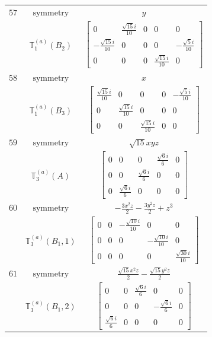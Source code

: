 \documentclass[fleqn,8pt,landscape]{jsarticle}
\begin{document}
\begin{longtable}{ccc}
$ 57 $ & $ \text{symmetry} $ & $ y $ \\
$  $ & $ \mathbb{T}_{1}^{(a)}(B_{2}) $ & $ \begin{bmatrix} 0 & \frac{\sqrt{15} i}{10} & 0 & 0 & 0 \\ - \frac{\sqrt{15} i}{10} & 0 & 0 & 0 & - \frac{\sqrt{5} i}{10} \\ 0 & 0 & 0 & \frac{\sqrt{15} i}{10} & 0 \end{bmatrix} $ \\ \hline
$ 58 $ & $ \text{symmetry} $ & $ x $ \\
$  $ & $ \mathbb{T}_{1}^{(a)}(B_{3}) $ & $ \begin{bmatrix} \frac{\sqrt{15} i}{10} & 0 & 0 & 0 & - \frac{\sqrt{5} i}{10} \\ 0 & \frac{\sqrt{15} i}{10} & 0 & 0 & 0 \\ 0 & 0 & \frac{\sqrt{15} i}{10} & 0 & 0 \end{bmatrix} $ \\ \hline
$ 59 $ & $ \text{symmetry} $ & $ \sqrt{15} x y z $ \\
$  $ & $ \mathbb{T}_{3}^{(a)}(A) $ & $ \begin{bmatrix} 0 & 0 & 0 & \frac{\sqrt{6} i}{6} & 0 \\ 0 & 0 & \frac{\sqrt{6} i}{6} & 0 & 0 \\ 0 & \frac{\sqrt{6} i}{6} & 0 & 0 & 0 \end{bmatrix} $ \\ \hline
$ 60 $ & $ \text{symmetry} $ & $ - \frac{3 x^{2} z}{2} - \frac{3 y^{2} z}{2} + z^{3} $ \\
$  $ & $ \mathbb{T}_{3}^{(a)}(B_{1},1) $ & $ \begin{bmatrix} 0 & 0 & - \frac{\sqrt{10} i}{10} & 0 & 0 \\ 0 & 0 & 0 & - \frac{\sqrt{10} i}{10} & 0 \\ 0 & 0 & 0 & 0 & \frac{\sqrt{30} i}{10} \end{bmatrix} $ \\ \hline
$ 61 $ & $ \text{symmetry} $ & $ \frac{\sqrt{15} x^{2} z}{2} - \frac{\sqrt{15} y^{2} z}{2} $ \\
$  $ & $ \mathbb{T}_{3}^{(a)}(B_{1},2) $ & $ \begin{bmatrix} 0 & 0 & \frac{\sqrt{6} i}{6} & 0 & 0 \\ 0 & 0 & 0 & - \frac{\sqrt{6} i}{6} & 0 \\ \frac{\sqrt{6} i}{6} & 0 & 0 & 0 & 0 \end{bmatrix} $ \\ \hline

\end{longtable}
\end{document}
